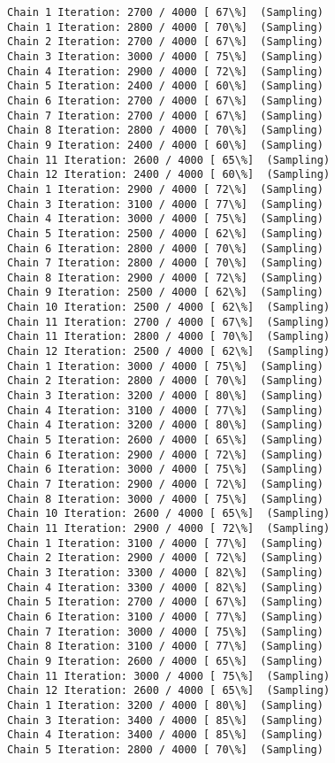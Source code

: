 \documentclass[11pt]{article}
\begin{document}
\begin{Verbatim}[commandchars=\\\{\}]
Chain 1 Iteration: 2700 / 4000 [ 67\%]  (Sampling)
Chain 1 Iteration: 2800 / 4000 [ 70\%]  (Sampling)
Chain 2 Iteration: 2700 / 4000 [ 67\%]  (Sampling)
Chain 3 Iteration: 3000 / 4000 [ 75\%]  (Sampling)
Chain 4 Iteration: 2900 / 4000 [ 72\%]  (Sampling)
Chain 5 Iteration: 2400 / 4000 [ 60\%]  (Sampling)
Chain 6 Iteration: 2700 / 4000 [ 67\%]  (Sampling)
Chain 7 Iteration: 2700 / 4000 [ 67\%]  (Sampling)
Chain 8 Iteration: 2800 / 4000 [ 70\%]  (Sampling)
Chain 9 Iteration: 2400 / 4000 [ 60\%]  (Sampling)
Chain 11 Iteration: 2600 / 4000 [ 65\%]  (Sampling)
Chain 12 Iteration: 2400 / 4000 [ 60\%]  (Sampling)
Chain 1 Iteration: 2900 / 4000 [ 72\%]  (Sampling)
Chain 3 Iteration: 3100 / 4000 [ 77\%]  (Sampling)
Chain 4 Iteration: 3000 / 4000 [ 75\%]  (Sampling)
Chain 5 Iteration: 2500 / 4000 [ 62\%]  (Sampling)
Chain 6 Iteration: 2800 / 4000 [ 70\%]  (Sampling)
Chain 7 Iteration: 2800 / 4000 [ 70\%]  (Sampling)
Chain 8 Iteration: 2900 / 4000 [ 72\%]  (Sampling)
Chain 9 Iteration: 2500 / 4000 [ 62\%]  (Sampling)
Chain 10 Iteration: 2500 / 4000 [ 62\%]  (Sampling)
Chain 11 Iteration: 2700 / 4000 [ 67\%]  (Sampling)
Chain 11 Iteration: 2800 / 4000 [ 70\%]  (Sampling)
Chain 12 Iteration: 2500 / 4000 [ 62\%]  (Sampling)
Chain 1 Iteration: 3000 / 4000 [ 75\%]  (Sampling)
Chain 2 Iteration: 2800 / 4000 [ 70\%]  (Sampling)
Chain 3 Iteration: 3200 / 4000 [ 80\%]  (Sampling)
Chain 4 Iteration: 3100 / 4000 [ 77\%]  (Sampling)
Chain 4 Iteration: 3200 / 4000 [ 80\%]  (Sampling)
Chain 5 Iteration: 2600 / 4000 [ 65\%]  (Sampling)
Chain 6 Iteration: 2900 / 4000 [ 72\%]  (Sampling)
Chain 6 Iteration: 3000 / 4000 [ 75\%]  (Sampling)
Chain 7 Iteration: 2900 / 4000 [ 72\%]  (Sampling)
Chain 8 Iteration: 3000 / 4000 [ 75\%]  (Sampling)
Chain 10 Iteration: 2600 / 4000 [ 65\%]  (Sampling)
Chain 11 Iteration: 2900 / 4000 [ 72\%]  (Sampling)
Chain 1 Iteration: 3100 / 4000 [ 77\%]  (Sampling)
Chain 2 Iteration: 2900 / 4000 [ 72\%]  (Sampling)
Chain 3 Iteration: 3300 / 4000 [ 82\%]  (Sampling)
Chain 4 Iteration: 3300 / 4000 [ 82\%]  (Sampling)
Chain 5 Iteration: 2700 / 4000 [ 67\%]  (Sampling)
Chain 6 Iteration: 3100 / 4000 [ 77\%]  (Sampling)
Chain 7 Iteration: 3000 / 4000 [ 75\%]  (Sampling)
Chain 8 Iteration: 3100 / 4000 [ 77\%]  (Sampling)
Chain 9 Iteration: 2600 / 4000 [ 65\%]  (Sampling)
Chain 11 Iteration: 3000 / 4000 [ 75\%]  (Sampling)
Chain 12 Iteration: 2600 / 4000 [ 65\%]  (Sampling)
Chain 1 Iteration: 3200 / 4000 [ 80\%]  (Sampling)
Chain 3 Iteration: 3400 / 4000 [ 85\%]  (Sampling)
Chain 4 Iteration: 3400 / 4000 [ 85\%]  (Sampling)
Chain 5 Iteration: 2800 / 4000 [ 70\%]  (Sampling)

\end{Verbatim}
\end{document}
